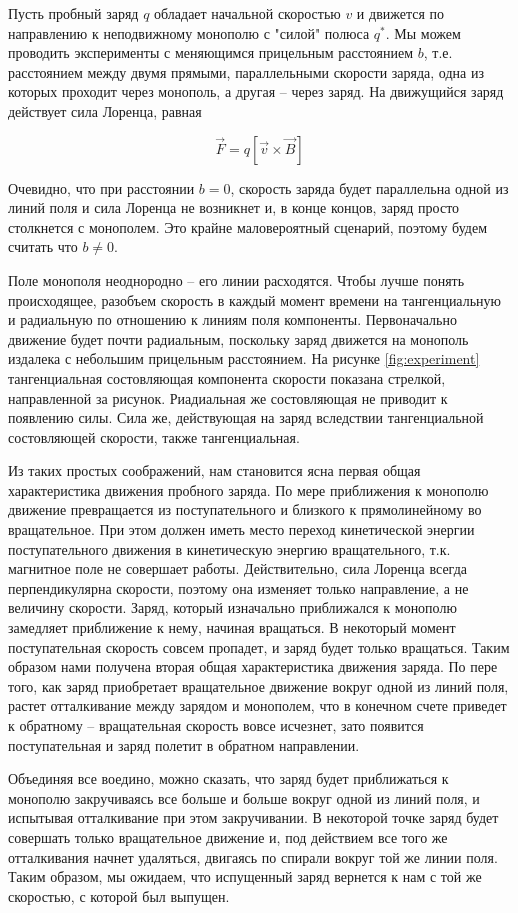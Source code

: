 \documentclass[a4paper, 12pt]{article}
\begin{document}
Пусть пробный заряд $q$ обладает начальной скоростью $v$ и движется по направлению к неподвижному монополю с "силой" полюса $q^*$. Мы можем проводить эксперименты с меняющимся прицельным расстоянием $b$, т.е. расстоянием между двумя прямыми, параллельными скорости заряда, одна из которых проходит через монополь, а другая -- через заряд. На движущийся заряд действует сила Лоренца, равная

\[
    \vec{F} = q\left[\vec{v}\times\vec{B}\right]
\]

Очевидно, что при расстоянии $b = 0$, скорость заряда будет параллельна одной из линий поля и сила Лоренца не возникнет и, в конце концов, заряд просто столкнется с монополем. Это крайне маловероятный сценарий, поэтому будем считать что $b \neq 0$. 

Поле монополя неоднородно -- его линии расходятся. Чтобы лучше понять происходящее, разобъем скорость в каждый момент времени на тангенциальную и радиальную по отношению к линиям поля компоненты. Первоначально движение будет почти радиальным, поскольку заряд движется на монополь издалека с небольшим прицельным расстоянием. На рисунке \ref{fig:experiment} тангенциальная состовляющая компонента скорости показана стрелкой, направленной за рисунок. Риадиальная же состовляющая не приводит к появлению силы. Сила же, действующая на заряд вследствии тангенциальной состовляющей скорости, также тангенциальная. 

Из таких простых соображений, нам становится ясна первая общая характеристика движения пробного заряда. По мере приближения к монополю движение превращается из поступательного и близкого к прямолинейному во вращательное. При этом должен иметь место переход кинетической энергии поступательного движения в кинетическую энергию вращательного, т.к. магнитное поле не совершает работы. Действительно, сила Лоренца всегда перпендикулярна скорости, поэтому она изменяет только направление, а не величину скорости. Заряд, который изначально приближался к монополю замедляет приближение к нему, начиная вращаться. В некоторый момент поступательная скорость совсем пропадет, и заряд будет только вращаться. Таким образом нами получена вторая общая характеристика движения заряда. По пере того, как заряд приобретает вращательное движение вокруг одной из линий поля, растет отталкивание между зарядом и монополем, что в конечном счете приведет к обратному -- вращательная скорость вовсе исчезнет, зато появится поступательная и заряд полетит в обратном направлении. 

Объединяя все воедино, можно сказать, что заряд будет приближаться к монополю закручиваясь все больше и больше вокруг одной из линий поля, и испытывая отталкивание при этом закручивании. В некоторой точке заряд будет совершать только вращательное движение и, под действием все того же отталкивания начнет удаляться, двигаясь по спирали вокруг той же линии поля. Таким образом, мы ожидаем, что испущенный заряд вернется к нам с той же скоростью, с которой был выпущен. 
\end{document}

